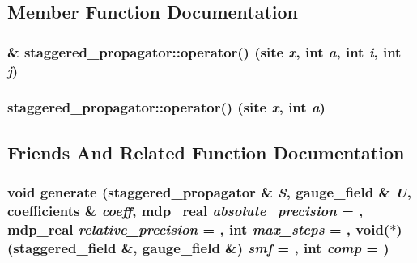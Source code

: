 \subsection{Member Function Documentation}
\hypertarget{classstaggered__propagator_aed9bbdd906e6e68f806a895c5e1bd2d8}{
\subsubsection[{operator()}]{\& staggered\_\-propagator::operator() (site {\em x}, \/  int {\em a}, \/  int {\em i}, \/  int {\em j})}}
\label{classstaggered__propagator_aed9bbdd906e6e68f806a895c5e1bd2d8}
\hypertarget{classstaggered__propagator_ae5c5d6720631c30938b09de4d3331e7f}{
\subsubsection[{operator()}]{ staggered\_\-propagator::operator() (site {\em x}, \/  int {\em a})}}
\label{classstaggered__propagator_ae5c5d6720631c30938b09de4d3331e7f}


\subsection{Friends And Related Function Documentation}
\hypertarget{classstaggered__propagator_a7849b2db88d889afda04b4ee01476b64}{
\subsubsection[{generate}]{\setlength{\rightskip}{0pt plus 5cm}void generate ({\bf staggered\_\-propagator} \& {\em S}, \/  {\bf gauge\_\-field} \& {\em U}, \/  {\bf coefficients} \& {\em coeff}, \/  {\bf mdp\_\-real} {\em absolute\_\-precision} = {}, \/  {\bf mdp\_\-real} {\em relative\_\-precision} = {}, \/  int {\em max\_\-steps} = {}, \/  void($\ast$)({\bf staggered\_\-field} \&, {\bf gauge\_\-field} \&) {\em smf} = {}, \/  int {\em comp} = {})}}
\label{classstaggered__propagator_a7849b2db88d889afda04b4ee01476b64}


